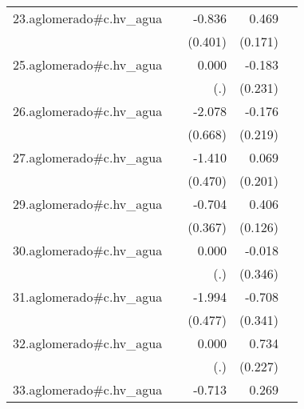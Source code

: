{\begin{longtable}{l*{4}{D{.}{.}{-1}}}
\addlinespace
23.aglomerado#c.hv\_agua&                     &      -0.836\sym{*}  &       0.469\sym{**} &                     \\
            &                     &     (0.401)         &     (0.171)         &                     \\
\addlinespace
25.aglomerado#c.hv\_agua&                     &       0.000         &      -0.183         &                     \\
            &                     &         (.)         &     (0.231)         &                     \\
\addlinespace
26.aglomerado#c.hv\_agua&                     &      -2.078\sym{**} &      -0.176         &                     \\
            &                     &     (0.668)         &     (0.219)         &                     \\
\addlinespace
27.aglomerado#c.hv\_agua&                     &      -1.410\sym{**} &       0.069         &                     \\
            &                     &     (0.470)         &     (0.201)         &                     \\
\addlinespace
29.aglomerado#c.hv\_agua&                     &      -0.704         &       0.406\sym{**} &                     \\
            &                     &     (0.367)         &     (0.126)         &                     \\
\addlinespace
30.aglomerado#c.hv\_agua&                     &       0.000         &      -0.018         &                     \\
            &                     &         (.)         &     (0.346)         &                     \\
\addlinespace
31.aglomerado#c.hv\_agua&                     &      -1.994\sym{***}&      -0.708\sym{*}  &                     \\
            &                     &     (0.477)         &     (0.341)         &                     \\
\addlinespace
32.aglomerado#c.hv\_agua&                     &       0.000         &       0.734\sym{**} &                     \\
            &                     &         (.)         &     (0.227)         &                     \\
\addlinespace
33.aglomerado#c.hv\_agua&                     &      -0.713\sym{*}  &       0.269\sym{**} &                     \\

\end{longtable}}

